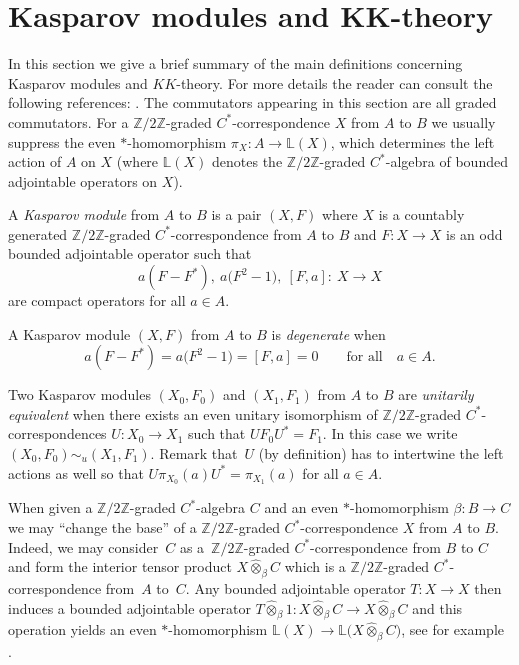 \documentclass[pdftex]{sigma}
\numberwithin{equation}{section}
\newcommand{\hot}{\widehat \otimes}
\newcommand{\zz}{\mathbb{Z}}
\newcommand{\be}{\beta}
\newcommand{\B}[1]{\mathbb{#1}}
\begin{document}
\section[Kasparov modules and $KK$-theory]{Kasparov modules and $\boldsymbol{KK}$-theory}\label{s:boukas}
In this section we give a brief summary of the main definitions concerning Kasparov modules and $KK$-theory. For more details the reader can consult the following references: \cite{Bla:KOA,JeTh:EKT, Kas:OFE}. The commutators appearing in this section are all graded commutators. For a $\zz/2\zz$-graded $C^*$-correspondence $X$ from $A$ to $B$ we usually suppress the even $*$-homomorphism $\pi_X\colon A \to \B L(X)$, which determines the left action of $A$ on $X$ (where $\B L(X)$ denotes the $\zz/2\zz$-graded $C^*$-algebra of bounded adjointable operators on $X$).

\begin{dfn}
A \emph{Kasparov module} from $A$ to $B$ is a pair $(X,F)$ where $X$ is a countably generated $\zz/2\zz$-graded $C^*$-correspondence from $A$ to $B$ and $F\colon X \to X$ is an odd bounded adjointable operator such that
\[
a (F - F^*) , \ a \big(F^2 - 1\big) , \ [F,a] \colon \ X \to X
\]
are compact operators for all $a \in A$.

A Kasparov module $(X,F)$ from $A$ to $B$ is \emph{degenerate} when
\[
a (F - F^*) = a \big(F^2 - 1\big) = [F,a] = 0 \qquad \mbox{for all} \quad a \in A .
\]
\end{dfn}

\begin{dfn}Two Kasparov modules $(X_0,F_0)$ and $(X_1,F_1)$ from $A$ to $B$ are \emph{unitarily equivalent} when there exists an even unitary isomorphism of $\zz/2\zz$-graded $C^*$-correspondences $U\colon X_0 \to X_1$ such that $U F_0 U^* = F_1$. In this case we write $(X_0,F_0) \sim_u (X_1,F_1)$. Remark that~$U$ (by definition) has to intertwine the left actions as well so that $U \pi_{X_0}(a) U^* = \pi_{X_1}(a)$ for all $a \in A$.
\end{dfn}

When given a $\zz/2\zz$-graded $C^*$-algebra $C$ and an even $*$-homomorphism $\be\colon B \to C$ we may ``change the base'' of a $\zz/2\zz$-graded $C^*$-correspondence $X$ from $A$ to $B$. Indeed, we may consider~$C$ as a~$\zz/2\zz$-graded $C^*$-correspondence from $B$ to $C$ and form the interior tensor product $X \hot_{\be} C$ which is a $\zz/2\zz$-graded $C^*$-correspondence from~$A$ to~$C$. Any bounded adjointable operator $T\colon X \to X$ then induces a bounded adjointable operator $T \hot_{\be} 1\colon X \hot_{\be} C \to X \hot_{\be} C$ and this operation yields an even $*$-homomorphism $\B L(X) \to \B L\big(X \hot_{\be} C\big)$, see for example \cite[Chapter~4]{Lan:HCM}.
\end{document}
